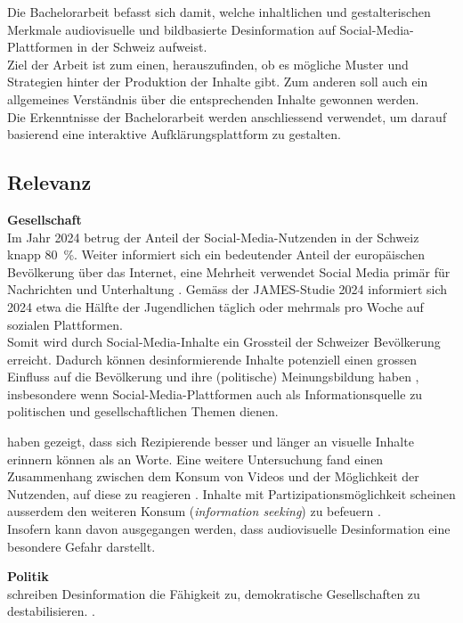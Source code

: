 \documentclass[12pt,a4paper]{article}        %
\begin{document}
Die Bachelorarbeit befasst sich damit, welche inhaltlichen und gestalterischen Merkmale audiovisuelle und bildbasierte Desinformation auf Social-Media-Plattformen in der Schweiz aufweist. \\
Ziel der Arbeit ist zum einen, herauszufinden, ob es mögliche Muster und Strategien hinter der Produktion der Inhalte gibt. Zum anderen soll auch ein allgemeines Verständnis über die entsprechenden Inhalte gewonnen werden. \\
Die Erkenntnisse der Bachelorarbeit werden anschliessend verwendet, um darauf basierend eine interaktive Aufklärungsplattform zu gestalten.

\subsection{Relevanz}
\textbf{Gesellschaft} \\
Im Jahr 2024 betrug der Anteil der Social-Media-Nutzenden in der Schweiz knapp 80 \%. Weiter informiert sich ein bedeutender Anteil der europäischen Bevölkerung über das Internet, eine Mehrheit verwendet Social Media primär für Nachrichten und Unterhaltung \parencite[21ff]{we_are_social_anteil_2024}. Gemäss der JAMES-Studie 2024 \parencite[40]{kulling-knecht_james_2024} informiert sich 2024 etwa die Hälfte der Jugendlichen täglich oder mehrmals pro Woche auf sozialen Plattformen. \\
Somit wird durch Social-Media-Inhalte ein Grossteil der Schweizer Bevölkerung erreicht. Dadurch können desinformierende Inhalte potenziell einen grossen Einfluss auf die Bevölkerung und ihre (politische) Meinungsbildung haben \parencites[18]{grujic_warnhinweise_2024}[258]{hohlfeld_schlechte_2020}[1f]{khan_fake_2021}, insbesondere wenn Social-Media-Plattformen auch als Informationsquelle zu politischen und gesellschaftlichen Themen dienen.

\textcite{grady_neural_1998} haben gezeigt, dass sich Rezipierende besser und länger an visuelle Inhalte erinnern können als an Worte. Eine weitere Untersuchung fand einen Zusammenhang zwischen dem Konsum von Videos und der Möglichkeit der Nutzenden, auf diese zu reagieren \parencite[242]{khan_social_2017}. Inhalte mit Partizipationsmöglichkeit scheinen ausserdem den weiteren Konsum (\textit{information seeking}) zu befeuern \parencite[243]{khan_social_2017}. \\
Insofern kann davon ausgegangen werden, dass audiovisuelle Desinformation eine besondere Gefahr darstellt.

\textbf{Politik} \\
\textcite[258]{hohlfeld_schlechte_2020} schreiben Desinformation die Fähigkeit zu, demokratische Gesellschaften  zu destabilisieren. \parencite[vgl.\ auch][1]{khan_fake_2021}.
\end{document}
